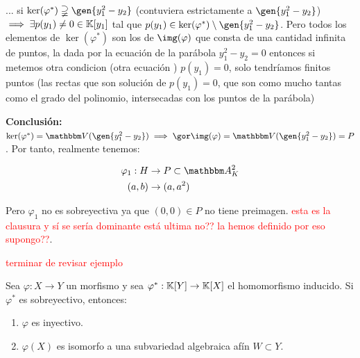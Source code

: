 \begin{example}
	... si $\ker(\varphi^*) \supsetneqq \gen{y_1^2-y_2}$ (contuviera estrictamente a $\gen{y_1^2-y_2}$) $\implies \exists p(y_1)\neq 0 \in \mathbb{K}[y_1]$ tal que $p(y_1) \in \ker(\varphi^*) \setminus \gen{y_1^2 - y_2}$. Pero todos los elementos de $\ker(\varphi^*)$ son los de $\img(\varphi)$ que consta de una cantidad infinita de puntos, la dada por la ecuación de la parábola $y_1^2-y_2=0$ entonces si metemos otra condicion (otra ecuación ) $p(y_1)=0$, solo tendríamos finitos puntos (las rectas que son solución de $p(y_1)=0$, que son como mucho tantas como el grado del polinomio, intersecadas con los puntos de la parábola)

	\textbf{Conclusión: }$ \ker(\varphi^*)=\V(\gen{y_1^2-y_2}) \implies \cls{\img(\varphi)}= \V(\gen{y_1^2-y_2})=P$. Por tanto, realmente tenemos:

	\begin{align*}
		\varphi_1: H & \rightarrow P \subset \A^2_K\\
		(a,b) & \rightarrow (a,a^2)
	\end{align*}

	Pero $\varphi_1$ no es sobreyectiva ya que $(0,0) \in P$ no tiene preimagen. \textcolor{red}{esta es la clausura y sí se sería dominante está ultima no?? la hemos definido por eso supongo??}.

	\textcolor{red}{terminar de revisar ejemplo}
\end{example}

\begin{lemma} \label{lem:MorfismoInducidoSobreyectivo}
	Sea $\varphi: X \rightarrow Y$ un morfismo y sea $\varphi^*: \mathbb{K}[Y]\rightarrow \mathbb{K}[X]$ el homomorfismo inducido. Si $\varphi^*$ es sobreyectivo, entonces:
		\begin{enumerate}
			\item $\varphi$ es inyectivo.
			\item $\varphi(X)$ es isomorfo a una subvariedad algebraica afín $W \subset Y$.
		\end{enumerate}
\end{lemma}

